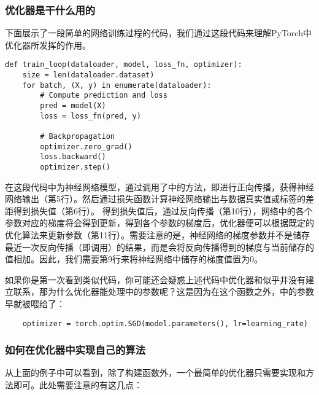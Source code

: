 \subsubsection{优化器是干什么用的}

下面展示了一段简单的网络训练过程的代码，我们通过这段代码来理解PyTorch中优化器所发挥的作用。

\begin{lstlisting}
def train_loop(dataloader, model, loss_fn, optimizer):
    size = len(dataloader.dataset)
    for batch, (X, y) in enumerate(dataloader):
        # Compute prediction and loss
        pred = model(X)
        loss = loss_fn(pred, y)
        
        # Backpropagation
        optimizer.zero_grad()
        loss.backward()
        optimizer.step()
\end{lstlisting}
    
在这段代码中为神经网络模型，通过调用了中的方法，即进行正向传播，获得神经网络输出（第5行）。然后通过损失函数计算神经网络输出与数据真实值或标签的差距得到损失值（第6行）。
得到损失值后，通过反向传播（第10行），网络中的各个参数对应的梯度将会得到更新，得到各个参数的梯度后，优化器便可以根据既定的优化算法来更新参数（第11行）。需要注意的是，神经网络的梯度参数并不是储存最近一次反向传播（即调用）的结果，而是会将反向传播得到的梯度与当前储存的值相加。因此，我们需要第9行来将神经网络中储存的梯度值置为0。

如果你是第一次看到类似代码，你可能还会疑惑上述代码中优化器和似乎并没有建立联系，那为什么优化器能处理中的参数呢？这是因为在这个函数之外，中的参数早就被喂给了：
\begin{lstlisting}
    optimizer = torch.optim.SGD(model.parameters(), lr=learning_rate)
\end{lstlisting}

\subsubsection{如何在优化器中实现自己的算法}

从上面的例子中可以看到，除了构建函数外，一个最简单的优化器只需要实现和方法即可。此处需要注意的有这几点：

